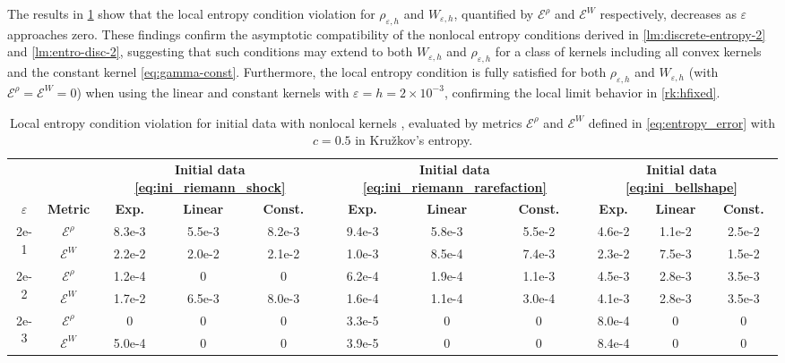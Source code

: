 \documentclass[10pt]{amsart}
\theoremstyle{plain}
\theoremstyle{definition}
\numberwithin{equation}{section}
\newcommand{\eps}{{\varepsilon}}
\begin{document}
The results in \cref{tab:entropy} show that the local entropy condition violation for $\rho_{\eps,h}$ and $W_{\eps,h}$, quantified by \(\mathcal{E}^\rho\) and \(\mathcal{E}^W\) respectively, decreases as $\varepsilon$ approaches zero. These findings confirm the asymptotic compatibility of the nonlocal entropy conditions derived in \cref{lm:discrete-entropy-2} and \cref{lm:entro-disc-2}, suggesting that such conditions may extend to both $W_{\eps,h}$ and $\rho_{\eps,h}$ for a class of kernels including all convex kernels and the constant kernel \cref{eq:gamma-const}.
Furthermore, the local entropy condition is fully satisfied for both $\rho_{\eps,h}$ and $W_{\eps,h}$ (with \(\mathcal{E}^\rho=\mathcal{E}^W=0\)) when using the linear and constant kernels  with $\eps=h=2\times10^{-3}$, confirming the local limit behavior in \cref{rk:hfixed}.

\begin{table}[htbp]
    \centering
    \setlength{\tabcolsep}{4pt}
    \renewcommand{\arraystretch}{1.3}
    \begin{tabular}{ccccccccccc}
        \toprule
        \textbf{} & \textbf{} & \multicolumn{3}{c}{\textbf{Initial data \cref{eq:ini_riemann_shock}}} & \multicolumn{3}{c}{\textbf{Initial data \cref{eq:ini_riemann_rarefaction}}} & \multicolumn{3}{c}{\textbf{Initial data \cref{eq:ini_bellshape}}} \\ \cmidrule{3-11}
        \textbf{\(\varepsilon\)} & \textbf{Metric} & \textbf{Exp.} & \textbf{Linear} & \textbf{Const.} & \textbf{Exp.} & \textbf{Linear} & \textbf{Const.} & \textbf{Exp.} & \textbf{Linear} & \textbf{Const.} \\ \midrule
        \multirow{2}{*}{2e-1} & \(\mathcal{E}^\rho\) & 8.3e-3 & 5.5e-3 & 8.2e-3 & 9.4e-3 & 5.8e-3 & 5.5e-2 & 4.6e-2 & 1.1e-2 & 2.5e-2 \\
        & \(\mathcal{E}^W\) & 2.2e-2 & 2.0e-2 & 2.1e-2 & 1.0e-3 & 8.5e-4 & 7.4e-3 & 2.3e-2 & 7.5e-3 & 1.5e-2 \\ \midrule
        \multirow{2}{*}{2e-2} & \(\mathcal{E}^\rho\) & 1.2e-4 & 0 & 0 & 6.2e-4 & 1.9e-4 & 1.1e-3 & 4.5e-3 & 2.8e-3 & 3.5e-3 \\
        & \(\mathcal{E}^W\) & 1.7e-2 & 6.5e-3 & 8.0e-3 & 1.6e-4 & 1.1e-4 & 3.0e-4 & 4.1e-3 & 2.8e-3 & 3.5e-3 \\ \midrule
        \multirow{2}{*}{2e-3} & \(\mathcal{E}^\rho\) & 0 & 0 & 0 & 3.3e-5 & 0 & 0 & 8.0e-4 & 0 & 0 \\
        & \(\mathcal{E}^W\) & 5.0e-4 & 0 & 0 & 3.9e-5 & 0 & 0 & 8.4e-4 & 0 & 0 \\ \bottomrule
    \end{tabular}
    \caption{Local entropy condition violation for initial data  with nonlocal kernels , evaluated by metrics \(\mathcal{E}^\rho\) and \(\mathcal{E}^W\) defined in \cref{eq:entropy_error} with $c=0.5$ in Kru\v{z}kov's entropy.}
    \label{tab:entropy}
\end{table}
\end{document}
